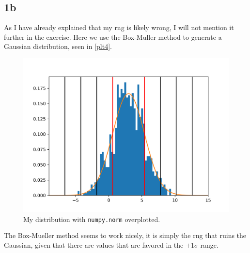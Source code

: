 \subsection{1b}



As I have already explained that my rng is likely wrong, I will not mention
it further in the exercise. Here we use the Box-Muller method to generate
a Gaussian distribution, seen in \autoref{plt4}.
\begin{figure}[h!]
    \centering
    \includegraphics[width=0.9\linewidth]{./plots/box_gauss.png}
    \caption{My distribution with \texttt{numpy.norm} overplotted.}
    \label{plt4}
\end{figure}
The Box-Mueller method seems to work nicely, it is simply the rng that
ruins the Gaussian, given that there are values that are favored in the
$+1\sigma$ range.
